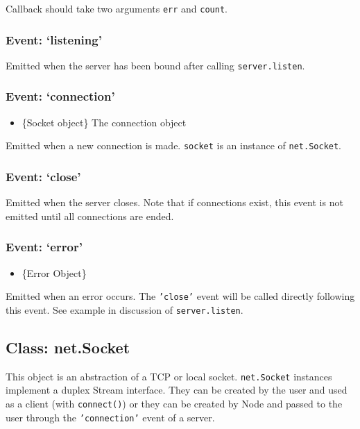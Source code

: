 Callback should take two arguments \texttt{err} and \texttt{count}.

\subsubsection{Event: `listening'}\label{event-listening}

Emitted when the server has been bound after calling
\texttt{server.listen}.

\subsubsection{Event: `connection'}\label{event-connection}

\begin{itemize}
\itemsep1pt\parskip0pt
\item
  \{Socket object\} The connection object
\end{itemize}

Emitted when a new connection is made. \texttt{socket} is an instance of
\texttt{net.Socket}.

\subsubsection{Event: `close'}\label{event-close}

Emitted when the server closes. Note that if connections exist, this
event is not emitted until all connections are ended.

\subsubsection{Event: `error'}\label{event-error}

\begin{itemize}
\itemsep1pt\parskip0pt
\item
  \{Error Object\}
\end{itemize}

Emitted when an error occurs. The \texttt{'close'} event will be called
directly following this event. See example in discussion of
\texttt{server.listen}.

\subsection{Class: net.Socket}\label{class-net.socket}

This object is an abstraction of a TCP or local socket.
\texttt{net.Socket} instances implement a duplex Stream interface. They
can be created by the user and used as a client (with
\texttt{connect()}) or they can be created by Node and passed to the
user through the \texttt{'connection'} event of a server.

